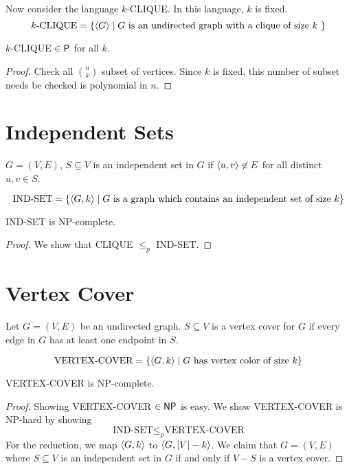 Now consider the language $k$-CLIQUE. In this language, $k$ is fixed.
$$
\text{$k$-CLIQUE} = \{ \langle G \rangle \mid \text{$G$ is an undirected graph with a clique of size $k$ }\}
$$
\begin{theorem}
    $k$-CLIQUE $\in \mathsf{P}$ for all $k$.
\end{theorem}

\begin{proof}
    Check all ${n \choose k}$ subset of vertices. Since $k$ is fixed, this number of subset needs be checked is polynomial in $n$.
\end{proof}

\section{Independent Sets}

$G=(V,E)$, $S \subseteq V$ is an independent set in $G$ if $\langle u,v \rangle\not\in E$ for all distinct $u,v \in S$.

$$
\text{IND-SET} = \{\langle G,k \rangle \mid \text{$G$ is a graph which contains an independent set of size $k$}\}
$$

\begin{theorem}
    IND-SET is NP-complete.
\end{theorem}

\begin{proof}
    We show that CLIQUE $\leq_p$ IND-SET.
\end{proof}

\section{Vertex Cover}

Let $G=(V,E)$ be an undirected graph. $S \subseteq V$ is a vertex cover for $G$ if every edge in $G$ has at least one endpoint in $S$.

$$
\text{VERTEX-COVER} = \{ \langle G,k \rangle \mid \text{$G$ has vertex color of size $k$}\}
$$

\begin{theorem}
    VERTEX-COVER is NP-complete.
\end{theorem}

\begin{proof}
    Showing VERTEX-COVER $\in \mathsf{NP}$ is easy. We show VERTEX-COVER is NP-hard by showing
    $$
    \text{IND-SET} \leq_p \text{VERTEX-COVER}
    $$
    For the reduction, we map $\langle G,k \rangle$ to $\langle G,|V|-k \rangle$. We claim that $G=(V,E)$ where $S \subseteq V$ is an independent set in $G$ if and only if $V-S$ is a vertex cover.
\end{proof}

